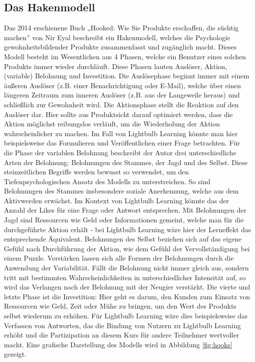 \subsection{Das Hakenmodell}
Das 2014 erschienene Buch „Hooked: Wie Sie Produkte erschaffen, die süchtig machen” \cite{Eyal2014} von Nir Eyal beschreibt ein Hakenmodell, welches die Psychologie gewohnheitsbildender Produkte zusammenfasst und zugänglich macht. Dieses Modell besteht im Wesentlichen aus 4 Phasen, welche ein Benutzer eines solchen Produkts immer wieder durchläuft. Diese Phasen lauten Auslöser, Aktion, (variable) Belohnung und Investition. Die Auslösephase beginnt immer mit einem äußeren Auslöser (z.B. einer Benachrichtigung oder E-Mail), welche über einen längeren Zeitraum zum inneren Auslöser (z.B. aus der Langeweile heraus) und schließlich zur Gewohnheit wird. Die Aktionsphase stellt die Reaktion auf den Auslöser dar. Hier sollte aus Produktsicht darauf optimiert werden, dass die Aktion möglichst reibungslos verläuft, um die Wiederholung der Aktion wahrscheinlicher zu machen. Im Fall von Lightbulb Learning könnte man hier beispielsweise das Formulieren und Veröffentlichen einer Frage betrachten. Für die Phase der variablen Belohnung beschreibt der Autor drei unterschiedliche Arten der Belohnung: Belohnungen des Stammes, der Jagd und des Selbst. Diese steinzeitlichen Begriffe werden bewusst so verwendet, um den Tiefenpsychologischen Ansatz des Modells zu unterstreichen. So sind Belohnungen des Stammes insbesondere soziale Anerkennung, welche aus dem Aktivwerden erwächst. Im Kontext von Lightbulb Learning könnte das der Anzahl der Likes für eine Frage oder Antwort entsprechen. Mit Belohnungen der Jagd sind Ressourcen wie Geld oder Informationen gemeint, welche man für die durchgeführte Aktion erhält - bei Lightbulb Learning wäre hier der Lerneffekt das entsprechende Äquivalent. Belohnungen des Selbst beziehen sich auf das eigene Gefühl nach Durchführung der Aktion, wie dem Gefühl der Vervollständigung bei einem Puzzle. Verstärken lassen sich alle Formen der Belohnungen durch die Anwendung der Variabilität. Fällt die Belohnung nicht immer gleich aus, sondern tritt mit bestimmten Wahrscheinlichkeiten in unterschiedlicher Intensität auf, so wird das Verlangen nach der Belohnung mit der Neugier verstärkt. Die vierte und letzte Phase ist die Investition: Hier geht es darum, den Kunden zum Einsatz von Ressourcen wie Geld, Zeit oder Mühe zu bringen, um den Wert des Produkts selbst wiederum zu erhöhen. Für Lightbulb Learning wäre dies beispielsweise das Verfassen von Antworten, das die Bindung von Nutzern zu Lightbulb Learning erhöht und die Partizipation an diesem Kurs für andere Teilnehmer wertvoller macht. Eine grafische Darstellung des Modells wird in Abbildung \ref{fig:hooks} gezeigt.

